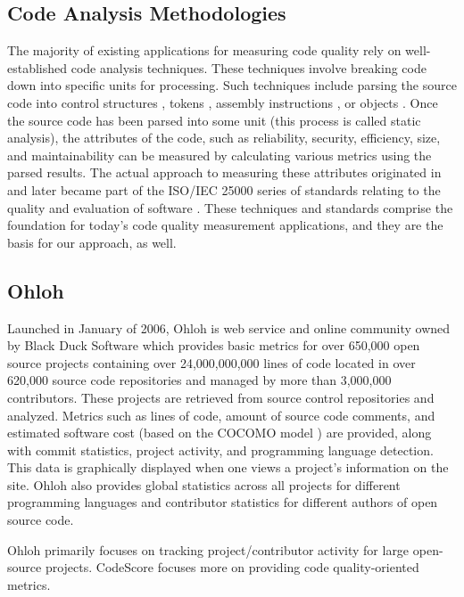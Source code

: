 \documentclass{sig-alternate}
\begin{document}
\subsection{Code Analysis Methodologies}
The majority of existing applications for measuring code quality rely on
well-established code analysis techniques. These techniques involve breaking
code down into specific units for processing. Such
techniques include parsing the source code into control structures
\cite{mccabe1976complexity}, tokens \cite{halstead1977elements}, assembly
instructions \cite{park1992software}, or objects \cite{chidamber1994metrics}.
Once the source code has been parsed into some unit (this process is called
static analysis), the attributes of the code, such as reliability, security,
efficiency, size, and maintainability can be measured by calculating various
metrics using the parsed results.
The actual approach to measuring these attributes originated in
\cite{boehm1976quantitative} and later became part of the ISO/IEC 25000 series
of standards relating to the quality and evaluation of software
\cite{iso2011iec}. These techniques and standards comprise the foundation for
today's code quality measurement applications, and they are the basis for our
approach, as well.

\subsection{Ohloh}
Launched in January of 2006, Ohloh \cite{allen2009ohloh} is web service and
online community owned by Black Duck Software which provides basic metrics for
over 650,000 open source projects containing over 24,000,000,000 lines of code
located in over 620,000 source code repositories and managed by more than
3,000,000 contributors. These projects are retrieved from source control
repositories and analyzed. Metrics such as lines of code, amount of source code
comments, and estimated software cost (based on the COCOMO model
\cite{boehm2000software}) are provided, along with commit statistics, project
activity, and programming language detection. This data is graphically displayed
when one views a project's information on the site. Ohloh also provides global
statistics across all projects for different programming languages and
contributor statistics for different authors of open source code. 

Ohloh primarily focuses on tracking project/contributor activity for large
open-source projects. CodeScore focuses more on providing code quality-oriented
metrics.
\end{document}
